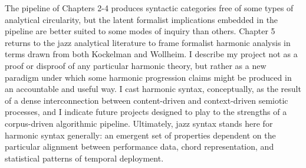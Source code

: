 The pipeline of Chapters 2-4 produces syntactic categories free of some types of analytical circularity, but the latent formalist implications embedded in the pipeline are better suited to some modes of inquiry than others.  Chapter 5 returns to the jazz analytical literature to frame formalist harmonic analysis in terms drawn from both Kockelman and Wollheim.  I describe my project not as a proof or disproof of any particular harmonic theory, but rather as a new paradigm under which some harmonic progression claims might be produced in an accountable and useful way.  I cast harmonic syntax, conceptually, as the result of a dense interconnection between content-driven and context-driven semiotic processes, and I indicate future projects designed to play to the strengths of a corpus-driven algorithmic pipeline.  Ultimately, jazz syntax stands here for harmonic syntax generally: an emergent set of properties dependent on the particular alignment between performance data, chord representation, and statistical patterns of temporal deployment.
